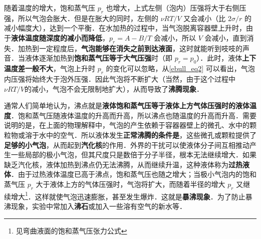 随着温度的增大，饱和蒸气压 $p_r$ 也增大，上式左侧（泡内）压强将大于右侧压强，所以气泡会胀大．但是在胀大的同时，左侧的 $\nu RT/V$ 又会减小（比 $2\sigma/r$ 的减小幅度大），达到一个平衡．在水加热的过程中，当气泡脱离容器壁上升时，由于\textbf{液体温度随深度的减小而降低}，$p_r=A-B/T$ 会减小，所以 $V$ 会减小，直到消失．加热到一定程度后，\textbf{气泡能够在消失之前到达液面}，这时就能听到吱吱的声音．当液体逐渐加热到\textbf{饱和蒸气压等于大气压强}时（即 $p_r=p_0$）．此时，液体\textbf{上下温度差一般不大}，气泡上升时 $p_r$ 的变化可以忽略，从\autoref{ebull_eq2} 可以看出，气泡内压强将始终大于泡外压强．因此气泡将不断扩大（当然，由于这个过程中 $\nu RT/V$的减小，气泡不会无限制地扩大），从而导致了\textbf{沸腾现象}．

通常人们简单地认为，沸点就是\textbf{液体饱和蒸气压等于液体上方气体压强时的液体温度}．饱和蒸气压随液体温度的升高而升高，所以沸点也随温度的升高而升高．需要说明的是，在上面的物理解释中，气泡的产生依赖于容器器壁上的微孔、水中的颗粒物或溶于水中的空气．所以液体发生\textbf{正常沸腾的条件是}，这些微孔或颗粒提供了\textbf{足够的小气泡}，从而起到\textbf{汽化核}的作用．外界的干扰可以使液体分子间互相推动产生一些局部的极小气泡，但其尺度只是数倍于分子半径，根本无法继续增大．如果缺乏汽化核，液体加热到沸点仍无法沸腾，从而继续升温，这种液体称为\textbf{过热液体}．由于过热液体温度已高于沸点，饱和蒸气压也随之增大；当极小气泡内的饱和蒸气压 $p_r$ 大于液体上方的气体压强时，气泡将扩大，而随着半径的增大 $p_r$ 又继续增大\footnote{见弯曲液面的饱和蒸气压张力公式}．这样就使气泡迅速膨胀，甚至发生爆炸．这就是\textbf{暴沸现象}．为了防止暴沸现象，实验中常加入\textbf{沸石}或加入一些溶有空气的新水等．
